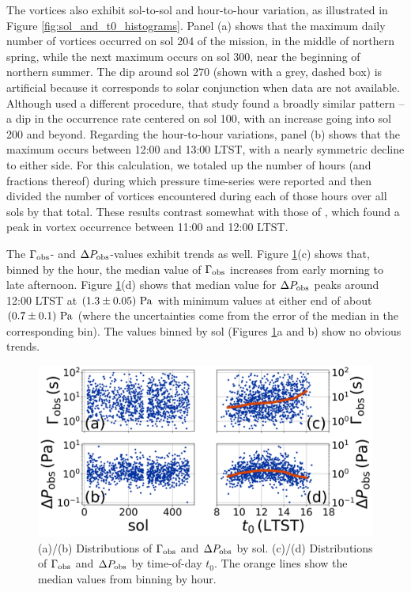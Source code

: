\documentclass[linenumbers,trackchanges]{aastex63}
\begin{document}
The vortices also exhibit sol-to-sol and hour-to-hour variation, as illustrated in Figure \ref{fig:sol_and_t0_histograms}. Panel (a) shows that the maximum daily number of vortices occurred on sol 204 of the mission, in the middle of northern spring, while the next maximum occurs on sol 300, near the beginning of northern summer. The dip around sol 270 (shown with a grey, dashed box) is artificial because it corresponds to solar conjunction when data are not available. Although \citet{Spiga2021} used a different procedure, that study found a broadly similar pattern -- a dip in the occurrence rate centered on sol 100, with an increase going into sol 200 and beyond. Regarding the hour-to-hour variations, panel (b) shows that the maximum occurs between 12:00 and 13:00 LTST, with a nearly symmetric decline to either side. For this calculation, we totaled up the number of hours (and fractions thereof) during which pressure time-series were reported and then divided the number of vortices encountered during each of those hours over all sols by that total. These results contrast somewhat with those of \citet{Spiga2021}, which found a peak in vortex occurrence between 11:00 and 12:00 LTST. 

The $\Gamma_{\rm obs}$- and $\Delta P_{\rm obs}$-values  exhibit  trends as well. Figure \ref{fig:Gammaobs_DeltaPobs_vs_TOD_and_sol}(c) shows that, binned by the hour, the median value of $\Gamma_{\rm obs}$  increases  from early morning to late afternoon. Figure \ref{fig:Gammaobs_DeltaPobs_vs_TOD_and_sol}(d) shows that median value for $\Delta P_{\rm obs}$ peaks around 12:00 LTST at $\left( 1.3\pm0.05 \right)\,{\rm Pa}$ with minimum values at either end of about $\left( 0.7\pm 0.1 \right)\,{\rm Pa}$ (where the uncertainties come from the error of the median in the corresponding bin).  The values binned by sol (Figures \ref{fig:Gammaobs_DeltaPobs_vs_TOD_and_sol}a and b) show no obvious trends. 

\begin{figure}
    \centering
    \includegraphics[width=\textwidth]{figures/Gammaobs_DeltaPobs_vs_TOD_and_sol.png}
    \caption{(a)/(b) Distributions of $\Gamma_{\rm obs}$ and $\Delta P_{\rm obs}$ by sol. (c)/(d) Distributions of $\Gamma_{\rm obs}$ and $\Delta P_{\rm obs}$ by time-of-day $t_0$. The orange lines show the median values from binning by hour.}
    \label{fig:Gammaobs_DeltaPobs_vs_TOD_and_sol}
\end{figure}
\end{document}
